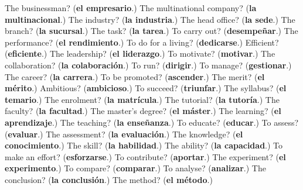 \begin{tcolorbox}[breakable,colback=teal!4,colframe=teal!35!black,title={Before you move on}]
The businessman? (\textbf{el empresario}.) The multinational company? (\textbf{la multinacional}.) The industry? (\textbf{la industria}.) The head office? (\textbf{la sede}.) The branch? (\textbf{la sucursal}.) The task? (\textbf{la tarea}.) To carry out? (\textbf{desempeñar}.) The performance? (\textbf{el rendimiento}.) To do for a living? (\textbf{dedicarse}.) Efficient? (\textbf{eficiente}.) The leadership? (\textbf{el liderazgo}.) To motivate? (\textbf{motivar}.) The collaboration? (\textbf{la colaboración}.) To run? (\textbf{dirigir}.) To manage? (\textbf{gestionar}.) The career? (\textbf{la carrera}.) To be promoted? (\textbf{ascender}.) The merit? (\textbf{el mérito}.) Ambitious? (\textbf{ambicioso}.) To succeed? (\textbf{triunfar}.) The syllabus? (\textbf{el temario}.) The enrolment? (\textbf{la matrícula}.) The tutorial? (\textbf{la tutoría}.) The faculty? (\textbf{la facultad}.) The master's degree? (\textbf{el máster}.) The learning? (\textbf{el aprendizaje}.) The teaching? (\textbf{la enseñanza}.) To educate? (\textbf{educar}.) To assess? (\textbf{evaluar}.) The assessment? (\textbf{la evaluación}.) The knowledge? (\textbf{el conocimiento}.) The skill? (\textbf{la habilidad}.) The ability? (\textbf{la capacidad}.) To make an effort? (\textbf{esforzarse}.) To contribute? (\textbf{aportar}.) The experiment? (\textbf{el experimento}.) To compare? (\textbf{comparar}.) To analyse? (\textbf{analizar}.) The conclusion? (\textbf{la conclusión}.) The method? (\textbf{el método}.)
\end{tcolorbox}
